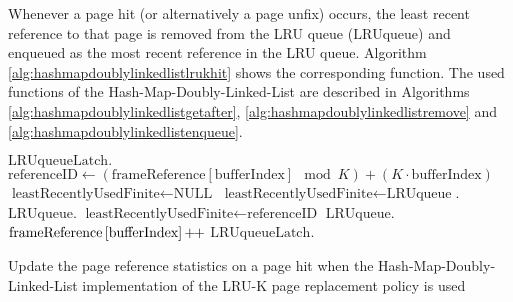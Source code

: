     Whenever a page hit (or alternatively a page unfix) occurs, the least recent reference to that page is removed from the LRU queue ($\text{LRUqueue}$) and enqueued as the most recent reference in the LRU queue. Algorithm \ref{alg:hashmapdoublylinkedlistlrukhit} shows the corresponding function. The used functions of the Hash-Map-Doubly-Linked-List are described in Algorithms \ref{alg:hashmapdoublylinkedlistgetafter}, \ref{alg:hashmapdoublylinkedlistremove} and \ref{alg:hashmapdoublylinkedlistenqueue}.

\begin{@empty}
    \newcommand{\plusplus}{\mathord{\mathord{+}\hspace*{-1pt}\mathord{+}}}

    \begin{algorithm}[h]
        \scriptsize
        \begin{algorithmic}[1]
                \State $\text{LRUqueueLatch}.$
                \State $\text{referenceID} \gets \left(\text{frameReference}\left[\text{bufferIndex}\right] \mod K\right) + \left(K \cdot \text{bufferIndex}\right)$
                        \State $\text{leastRecentlyUsedFinite} \gets \text{NULL}$
                    \Else
                        \State $\text{leastRecentlyUsedFinite} \gets \text{LRUqueue}$.
                    \EndIf
                \EndIf
                \State $\text{LRUqueue}$.
                    \State $\text{leastRecentlyUsedFinite} \gets \text{referenceID}$
                \EndIf
                \State $\text{LRUqueue}$.
                \State $\text{frameReference}\left[\text{bufferIndex}\right]\plusplus$
                \State $\text{LRUqueueLatch}.$
            \EndFunction
        \end{algorithmic}
        \vspace{1em}
        \caption[{\footnotesize \textbf{function} \textsc{onHit}} of Hash-Map-Doubly-Linked-List LRU-K]{Update the page reference statistics on a page hit when the Hash-Map-Doubly-Linked-List implementation of the LRU-K page replacement policy is used}
        \label{alg:hashmapdoublylinkedlistlrukhit}
    \end{algorithm}
\end{@empty}

